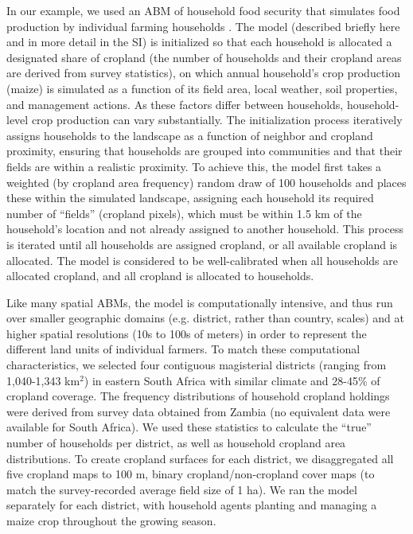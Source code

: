 \documentclass[a4paper]{article}
\begin{document}
In our example, we used an ABM of household food security that simulates food production by individual farming households \citep[the agents; ][]{chen_dependency_2013}. The model (described briefly here and in more detail in the SI) is initialized so that each household is allocated a designated share of cropland (the number of households and their cropland areas are derived from survey statistics), on which annual household's crop production (maize) is simulated as a function of its field area, local weather, soil properties, and management actions. As these factors differ between households, household-level crop production can vary substantially. The initialization process iteratively assigns households to the landscape as a function of neighbor and cropland proximity, ensuring that households are grouped into communities and that their fields are within a realistic proximity. To achieve this, the model first takes a weighted (by cropland area frequency) random draw of 100 households and places these within the simulated landscape, assigning each household its required number of ``fields'' (cropland pixels), which must be within 1.5 km of the household's location and not already assigned to another household. This process is iterated until all households are assigned cropland, or all available cropland is allocated. The model is considered to be well-calibrated when all households are allocated cropland, and all cropland is allocated to households. 

Like many spatial ABMs, the model is computationally intensive, and thus run over smaller geographic domains (e.g. district, rather than country, scales) and at higher spatial resolutions (10s to 100s of meters) in order to represent the different land units of individual farmers. To match these computational characteristics, we selected four contiguous magisterial districts (ranging from 1,040-1,343 km$^2$) in eastern South Africa with similar climate and 28-45\% of cropland coverage. The frequency distributions of household cropland holdings were derived from survey data obtained from Zambia (no equivalent data were available for South Africa). We used these statistics to calculate the ``true'' number of households per district, as well as household cropland area distributions. To create cropland surfaces for each district, we disaggregated all five cropland maps to 100 m, binary cropland/non-cropland cover maps (to match the survey-recorded average field size of 1 ha). We ran the model separately for each district, with household agents planting and managing a maize crop throughout the growing season.  
\end{document}
